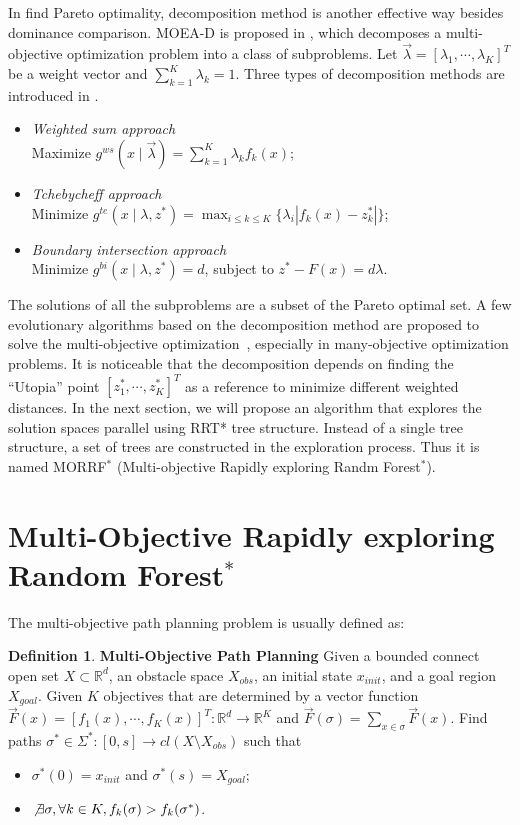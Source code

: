 \documentclass[conference]{IEEEtran}
\theoremstyle{definition}
\newtheorem{defn}{Definition}[section]
\begin{document}
In find Pareto optimality, decomposition method is another effective way besides dominance comparison.
MOEA-D is proposed in \cite{4358754}, which decomposes a multi-objective optimization problem into a class of subproblems.
Let $ \vec{\lambda} = [ \lambda_{1} , \cdots , \lambda_{K}  ]^{T} $ be a weight vector and $ \sum_{k=1}^{K} \lambda_{k} = 1 $.
Three types of decomposition methods are introduced in \cite{4358754}.
\begin{itemize}
\item \emph{Weighted sum approach} \\
Maximize $ g^{ws} (x \mid \vec{\lambda}) = \sum_{k=1}^{K} \lambda_{k} f_{k} (x) $;
\item \emph{Tchebycheff approach} \\
Minimize $ g^{te} (x \mid \lambda , z^{*}) = \max_{i \leq k \leq K}  \{ \lambda_{i} | f_{k}(x) - z^{*}_{k}  | \} $;
\item \emph{Boundary intersection approach} \\
Minimize $ g^{bi} (x \mid \lambda , z^{*} ) = d $, subject to $ z^{*} - F(x) = d \lambda $.
\end{itemize}
The solutions of all the subproblems are a subset of the Pareto optimal set.
A few evolutionary algorithms based on the decomposition method are proposed to solve the multi-objective optimization~\cite{6600851}, 
especially in many-objective optimization problems.
It is noticeable that the decomposition depends on finding the ``Utopia'' point $ [z^{*}_{1}, \cdots , z^{*}_{K}]^{T} $ as a reference to minimize different weighted distances.
In the next section, we will propose an algorithm that explores the solution spaces parallel using RRT* tree structure.
Instead of a single tree structure, a set of trees are constructed in the exploration process.
Thus it is named MORRF$^{*}$ (Multi-objective Rapidly exploring Randm Forest$^{*}$).



\section{Multi-Objective Rapidly exploring Random Forest$^{*}$}
\label{sec:morrt}

The multi-objective path planning problem is usually defined as:
\begin{defn}{ \textbf{Multi-Objective Path Planning} }
	Given a bounded connect open set $ X \subset \mathbb{R}^{d} $, an obstacle space $ X_{obs} $, an initial state $ x_{init} $, and a goal region $ X_{goal} $.
	Given $ K $ objectives that are determined by a vector function
	$ \vec{F}(x) = [ f_{1} (x), \cdots , f_{K}(x) ]^{T} : \mathbb{R}^{d} \rightarrow \mathbb{R}^{K} $ and 
	$ \vec{F}(\sigma) = \sum_{x \in \sigma} \vec{F}(x) $.
	Find paths $ \sigma^{*} \in \Sigma^{*}  : [0, s] \rightarrow cl(  X \setminus X_{obs} ) $ such that
	\begin{itemize}
		\item $ \sigma^{*} (0) = x_{init} $ and $ \sigma^{*} (s) = X_{goal}  $;
		\item $ \not \exists \sigma , \forall k \in K, f_{k} (\sigma) > f_{k} (\sigma^{*}) $.
	\end{itemize}
\end{defn}
\end{document}
